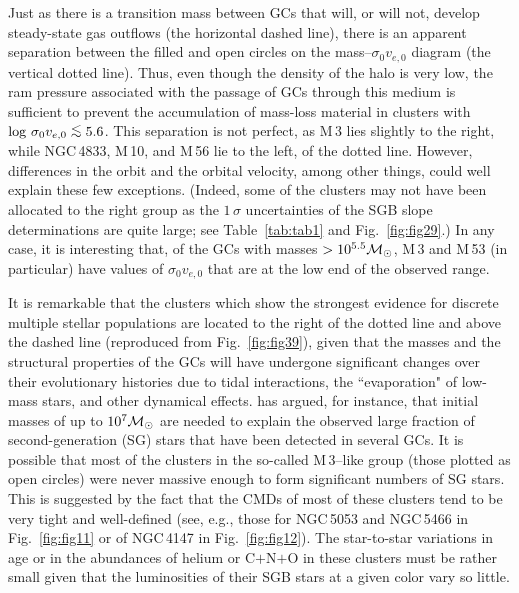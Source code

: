 \documentclass[12pt,preprint]{aastex}
\newcommand\msol{{\cal M_{\odot}}}
\newcommand\lta{\mathrel{\hbox{\raise 0.6 ex \hbox{$<$}\kern
                   -1.8 ex\lower .5 ex\hbox{$\sim$}}}}
\begin{document}
Just as there is a transition mass between GCs that will, or will not, develop
steady-state gas outflows (the horizontal dashed line), there is an apparent
separation between the filled and open circles on the mass--$\sigma_0v_{e,0}$
diagram (the vertical dotted line).  Thus, even though the density of the halo
is very low, the ram pressure associated with the passage of GCs through this
medium is sufficient to prevent the accumulation of mass-loss material in
clusters with $\log\,\sigma_0v_{e,0} \lta 5.6$.  This separation is not perfect,
as M$\,$3 lies slightly to the right, while NGC$\,$4833, M$\,$10, and M$\,$56
lie to the left, of the dotted line.  However, differences in the orbit and the
orbital velocity, among other things, could well explain these few exceptions.
(Indeed, some of the clusters may not have been allocated to the right group as
the  $1\,\sigma$ uncertainties of the SGB slope determinations are quite large;
see Table~\ref{tab:tab1} and Fig.~\ref{fig:fig29}.)  In any case, it is
interesting that, of the GCs with masses $> 10^{5.5} \msol$, M$\,$3 and
M$\,$53 (in particular) have values of $\sigma_0v_{e,0}$ that are at the low
end of the observed range.  

It is remarkable that the clusters which show the strongest evidence for
discrete multiple stellar populations are located to the right of the dotted
line and above the dashed line (reproduced from Fig.~\ref{fig:fig39}), given 
that the masses and the structural properties of the GCs will have undergone
significant changes over their evolutionary histories due to tidal interactions,
the ``evaporation" of low-mass stars, and other dynamical effects. \citet{bek11}
has argued, for instance, that initial masses of up to $10^7 \msol$ are needed
to explain the observed large fraction of second-generation (SG) stars that have
been detected in several GCs.  It is possible that most of the
clusters in the so-called M$\,$3--like group (those plotted as open circles)
were never massive enough to form significant numbers of SG stars.  This is
suggested by the fact that the CMDs of most of these clusters tend to be very
tight and well-defined (see, e.g., those for NGC$\,$5053 and NGC$\,$5466 in
Fig.~\ref{fig:fig11} or of NGC$\,$4147 in Fig.~\ref{fig:fig12}).
The star-to-star variations in age or in the abundances of helium or C$+$N$+$O
in these clusters must be rather small given that the luminosities of their SGB
stars at a given color vary so little.
\end{document}
